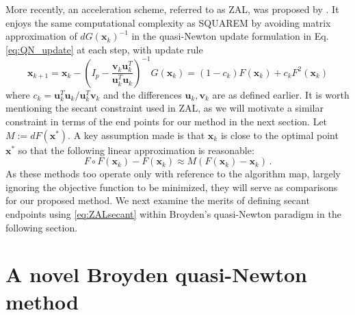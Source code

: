 \documentclass{statsoc}
\newcommand{\bu}{\boldsymbol{u}}
\newcommand{\bv}{\boldsymbol{v}}
\newcommand{\bx}{\boldsymbol{x}}
\begin{document}
 More recently, an acceleration scheme, referred to as ZAL, was proposed by \cite{zhou2011quasi}. It enjoys the same computational complexity as SQUAREM by avoiding matrix approximation of $dG(\bx_k)^{-1}$ in the quasi-Newton update formulation in Eq.\eqref{eq:QN_update} at each step, with update rule
\[
\bx_{k+1} = \bx_k - \left(I_p - \dfrac{\bv_k \bu_k^T}{\bu_k^T \bu_k} \right)^{-1} G(\bx_k) = (1 - c_k)F(\bx_k) + c_k F^2(\bx_k)
\]
where $c_k = \bu_k^T\bu_k/\bu_k^T\bv_k$ and the differences $\bu_k, 
\bv_k$ are as defined earlier. It is worth mentioning the secant constraint used in ZAL, as we will motivate a similar constraint in terms of the end points for our method in the next section. Let $M := dF(\bx^\ast)$. A key assumption made is that $\bx_k$ is close to the optimal point $\bx^\ast$ so that the following linear approximation is reasonable: 
\begin{equation} \label{eq:ZALsecant}
   F \circ F(\bx_k) - F(\bx_k) \approx M(F(\bx_k) - \bx_k)\,.   
\end{equation} 
As these methods too operate only with reference to the algorithm map, largely ignoring the objective function to be minimized, they will serve as comparisons for our proposed method. We next examine the merits of defining secant endpoints using  \eqref{eq:ZALsecant} within  Broyden's quasi-Newton paradigm in the following section. %



\section{A novel Broyden quasi-Newton method}
\end{document}
